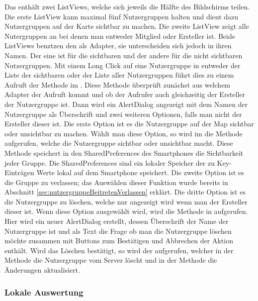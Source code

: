 Das  enthält zwei ListViews, welche sich jeweils die Hälfte des Bildschirms teilen. Die erste ListView kann maximal fünf Nutzergruppen halten und dient dazu Nutzergruppen auf der Karte sichtbar zu machen. Die zweite ListView zeigt alle Nutergruppen an bei denen man entweder Mitglied oder Ersteller ist. Beide ListViews benztzen den  als Adapter, sie unterscheiden sich jedoch in ihren Namen. Der eine ist für die sichtbaren und der andere für die nicht sichtbaren Nutzergruppen. Mit einem Long Click auf eine Nutzergruppe in entweder der Liste der sichtbaren oder der Liste aller Nutzergruppen führt dies zu einem Aufruft der  Methode im . Diese Methode überprüft zunächst aus welchem Adapter der Aufruft kommt und ob der Aufrufer auch gleichzeitig der Ersteller der Nutzergruppe ist. Dann wird ein AlertDialog angezeigt mit dem Namen der Nutzergruppe als Überschrift und zwei weiteren Optionen, falls man nicht der Ersteller dieser ist. Die erste Option ist es die Nutzergruppe auf der Map sichtbar oder unsichtbar zu machen. Wählt man diese Option, so wird im  die  Methode aufgerufen, welche die Nutzergruppe sichtbar oder unsichtbar macht. Diese Methode speichert in den SharedPreferences des Smartphones die Sichtbarkeit jeder Gruppe. Die SharedPreferences sind ein lokaler Speicher der zu Key-Einträgen Werte lokal auf dem Smartphone speichert. Die zweite Option ist es die Gruppe zu verlassen; das Auswählen dieser Funktion wurde bereits in Abschnitt \ref{sec:nutzergruppeBeitretenVerlassen} erklärt. Die dritte Option ist es die Nutzergruppe zu löschen, welche nur angezeigt wird wenn man der Ersteller dieser ist. Wenn diese Option ausgewählt wird, wird die  Methode in  aufgerufen. Hier wird ein neuer AlertDialog erstellt, dessen Überschrift der Name der Nutzergruppe ist und als Text die Frage ob man die Nutzergruppe löschen möchte zusammen mit Buttons zum Bestätigen und Abbrechen der Aktion enthält. Wird das Löschen bestätigt, so wird der  aufgerufen, welcher in der  Methode die Nutzergruppe vom Server löscht und in der  Methode die Änderungen aktualisiert. 
\FloatBarrier


\subsubsection{Lokale Auswertung}
\label{sec:lokaleAuswertung}

